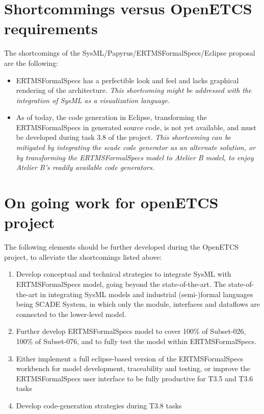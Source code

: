 \section{Shortcommings versus OpenETCS requirements}

The shortcomings of the SysML/Papyrus/ERTMSFormalSpecs/Eclipse proposal are the following:

\begin{itemize}
	\item ERTMSFormalSpecs has a perfectible look and feel and lacks graphical rendering of the architecture. \emph{This shortcoming might be addressed with the integration of SysML as a visualization language.}
	\item As of today, the code generation in Eclipse, transforming the ERTMSFormalSpecs in generated source code, is not yet available, and must be developed during task 3.8 of the project. \emph{This shortcoming can be mitigated by integrating the scade code generator as an alternate solution, or by transforming the ERTMSFormalSpecs model to Atelier B model, to enjoy Atelier B's readily available code generators.}
\end{itemize}

\section{On going work for openETCS project}

The following elements should be further developed during the OpenETCS project, to alleviate the shortcomings listed above:

\begin{enumerate}
  \item Develop conceptual and technical strategies to integrate SysML with ERTMSFormalSpecs model, going beyond the state-of-the-art. The state-of-the-art in integrating SysML models and industrial (semi-)formal languages being SCADE System, in which only the module, interfaces and dataflows are connected to the lower-level model.
	\item Further develop ERTMSFormalSpecs model to cover 100\% of Subset-026, 100\% of Subset-076, and to fully test the model within ERTMSFormalSpecs. 
	\item Either implement a full eclipse-based version of the ERTMSFormalSpecs workbench for model development, traceability and testing, or improve the ERTMSFormalSpecs user interface to be fully productive for T3.5 and T3.6 tasks
	\item Develop code-generation strategies during T3.8 tasks
\end{enumerate}

